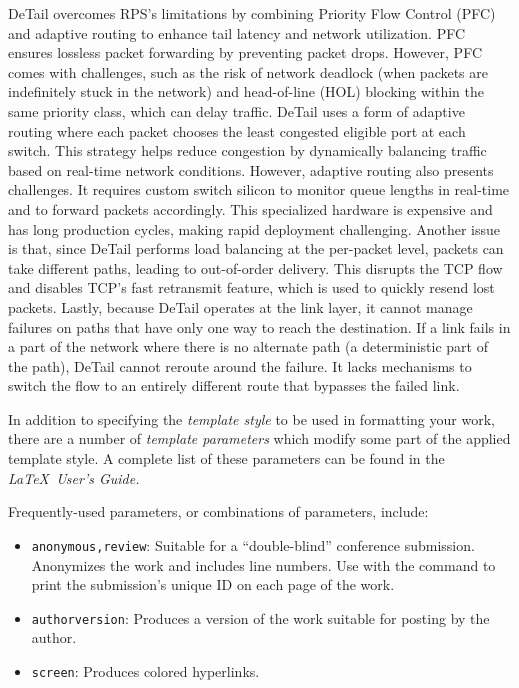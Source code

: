 \documentclass[11pt, sigconf]{acmart}
\begin{document}
DeTail overcomes RPS’s limitations by combining Priority Flow Control (PFC) and adaptive routing to enhance tail latency and network utilization. PFC ensures lossless packet forwarding by preventing packet drops. However, PFC comes with challenges, such as the risk of network deadlock (when packets are indefinitely stuck in the network) and head-of-line (HOL) blocking within the same priority class, which can delay traffic. DeTail uses a form of adaptive routing where each packet chooses the least congested eligible port at each switch. This strategy helps reduce congestion by dynamically balancing traffic based on real-time network conditions. However, adaptive routing also presents challenges. It requires custom switch silicon to monitor queue lengths in real-time and to forward packets accordingly. This specialized hardware is expensive and has long production cycles, making rapid deployment challenging. Another issue is that, since DeTail performs load balancing at the per-packet level, packets can take different paths, leading to out-of-order delivery. This disrupts the TCP flow and disables TCP’s fast retransmit feature, which is used to quickly resend lost packets. Lastly, because DeTail operates at the link layer, it cannot manage failures on paths that have only one way to reach the destination. If a link fails in a part of the network where there is no alternate path (a deterministic part of the path), DeTail cannot reroute around the failure. It lacks mechanisms to switch the flow to an entirely different route that bypasses the failed link.
 


In addition to specifying the {\itshape template style} to be used in
formatting your work, there are a number of {\itshape template parameters}
which modify some part of the applied template style. A complete list
of these parameters can be found in the {\itshape \LaTeX\ User's Guide.}

Frequently-used parameters, or combinations of parameters, include:
\begin{itemize}
\item {\texttt{anonymous,review}}: Suitable for a ``double-blind''
  conference submission. Anonymizes the work and includes line
  numbers. Use with the \texttt{\acmSubmissionID} command to print the
  submission's unique ID on each page of the work.
\item{\texttt{authorversion}}: Produces a version of the work suitable
  for posting by the author.
\item{\texttt{screen}}: Produces colored hyperlinks.
\end{itemize}
\end{document}
